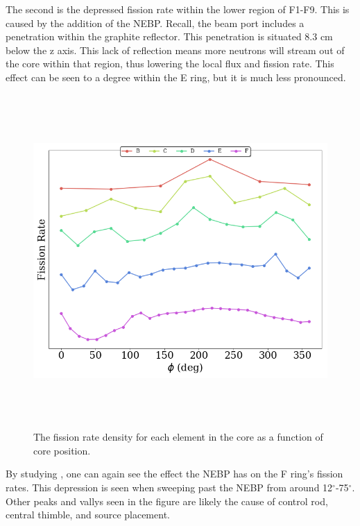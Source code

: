 The second is the depressed fission rate within the lower region of F1-F9.
This is caused by the addition of the NEBP.
Recall, the beam port includes a penetration within the graphite reflector. 
This penetration is situated 8.3 cm below the z axis.
This lack of reflection means more neutrons will stream out of the core within that region, thus lowering the local flux and fission rate.
This effect can be seen to a degree within the E ring, but it is much less pronounced.

\clearpage

\begin{figure}[htb]
\centering
\includegraphics[height=5in]{tex/figures/totals_azi.png}
\caption[Whole Core Azimuthal Fission Rate Density]{The fission rate density for each element in the core as a function of core position.}
\label{fig:totals_azi}
\end{figure}

By studying , one can again see the effect the NEBP has on the F ring's fission rates.
This depression is seen when sweeping past the NEBP from around 12$^{\circ}$-75$^{\circ}$.
Other peaks and vallys seen in the figure are likely the cause of control rod, central thimble, and source placement.


